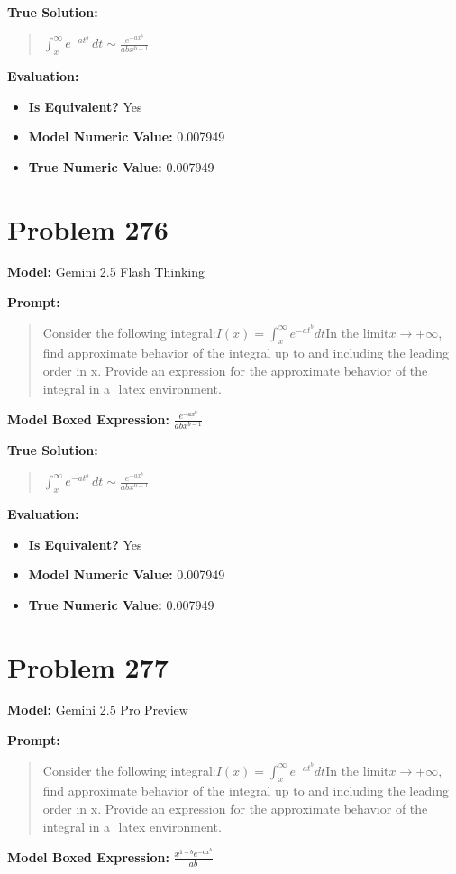 \documentclass{article}
\begin{document}
{\textbf{True Solution:}
\begin{quote}
$\int_{x}^{\infty} e^{-a t^b} \, dt \sim \frac{e^{-a x^b}}{a b x^{b-1}}$
\end{quote}

\textbf{Evaluation:}
\begin{itemize}
\item \textbf{Is Equivalent?} Yes
\item \textbf{Model Numeric Value:} 0.007949
\item \textbf{True Numeric Value:} 0.007949
\end{itemize}
\vspace{1cm}
\section*{Problem 276}
\textbf{Model:} Gemini 2.5 Flash Thinking

\textbf{Prompt:}
\begin{quote}
Consider the following integral:$I(x) = \int_{x}^{\infty} e^{-at^b} dt$In the limit$x \to +\infty$, find approximate behavior of the integral up to and including the leading order in x. Provide an expression for the approximate behavior of the integral in a $\boxed{}$ latex environment.
\end{quote}
\textbf{Model Boxed Expression:} $\frac{e^{-ax^b}}{abx^{b-1}}$

\textbf{True Solution:}
\begin{quote}
$\int_{x}^{\infty} e^{-a t^b} \, dt \sim \frac{e^{-a x^b}}{a b x^{b-1}}$
\end{quote}

\textbf{Evaluation:}
\begin{itemize}
\item \textbf{Is Equivalent?} Yes
\item \textbf{Model Numeric Value:} 0.007949
\item \textbf{True Numeric Value:} 0.007949
\end{itemize}
\vspace{1cm}
\section*{Problem 277}
\textbf{Model:} Gemini 2.5 Pro Preview

\textbf{Prompt:}
\begin{quote}
Consider the following integral:$I(x) = \int_{x}^{\infty} e^{-at^b} dt$In the limit$x \to +\infty$, find approximate behavior of the integral up to and including the leading order in x. Provide an expression for the approximate behavior of the integral in a $\boxed{}$ latex environment.
\end{quote}
\textbf{Model Boxed Expression:} $\frac{x^{1-b}e^{-ax^b}}{ab}$

}
\end{document}
